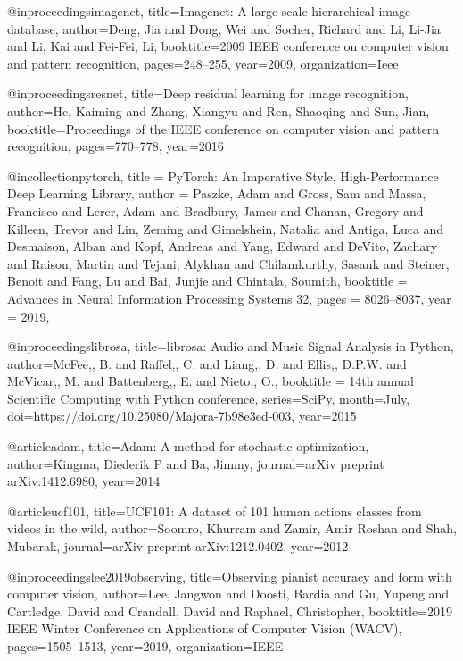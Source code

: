 @inproceedings{imagenet,
  title={Imagenet: A large-scale hierarchical image database},
  author={Deng, Jia and Dong, Wei and Socher, Richard and Li, Li-Jia and Li, Kai and Fei-Fei, Li},
  booktitle={2009 IEEE conference on computer vision and pattern recognition},
  pages={248--255},
  year={2009},
  organization={Ieee}
}

@inproceedings{resnet,
  title={Deep residual learning for image recognition},
  author={He, Kaiming and Zhang, Xiangyu and Ren, Shaoqing and Sun, Jian},
  booktitle={Proceedings of the IEEE conference on computer vision and pattern recognition},
  pages={770--778},
  year={2016}
}

@incollection{pytorch,
title = {PyTorch: An Imperative Style, High-Performance Deep Learning Library},
author = {Paszke, Adam and Gross, Sam and Massa, Francisco and Lerer, Adam and Bradbury, James and Chanan, Gregory and Killeen, Trevor and Lin, Zeming and Gimelshein, Natalia and Antiga, Luca and Desmaison, Alban and Kopf, Andreas and Yang, Edward and DeVito, Zachary and Raison, Martin and Tejani, Alykhan and Chilamkurthy, Sasank and Steiner, Benoit and Fang, Lu and Bai, Junjie and Chintala, Soumith},
booktitle = {Advances in Neural Information Processing Systems 32},
pages = {8026--8037},
year = {2019},
}

@inproceedings{librosa,
  title={librosa: Audio and Music Signal Analysis in Python},
  author={McFee,, B. and Raffel,, C. and Liang,, D. and Ellis,, D.P.W. and McVicar,, M. and Battenberg,, E. and Nieto,, O.},
  booktitle = {14th annual Scientific Computing with Python conference},
  series={SciPy},
  month={July},
  doi={https://doi.org/10.25080/Majora-7b98e3ed-003},
  year={2015}
}

@article{adam,
  title={Adam: A method for stochastic optimization},
  author={Kingma, Diederik P and Ba, Jimmy},
  journal={arXiv preprint arXiv:1412.6980},
  year={2014}
}

@article{ucf101,
  title={UCF101: A dataset of 101 human actions classes from videos in the wild},
  author={Soomro, Khurram and Zamir, Amir Roshan and Shah, Mubarak},
  journal={arXiv preprint arXiv:1212.0402},
  year={2012}
}

@inproceedings{lee2019observing,
  title={Observing pianist accuracy and form with computer vision},
  author={Lee, Jangwon and Doosti, Bardia and Gu, Yupeng and Cartledge, David and Crandall, David and Raphael, Christopher},
  booktitle={2019 IEEE Winter Conference on Applications of Computer Vision (WACV)},
  pages={1505--1513},
  year={2019},
  organization={IEEE}
}


